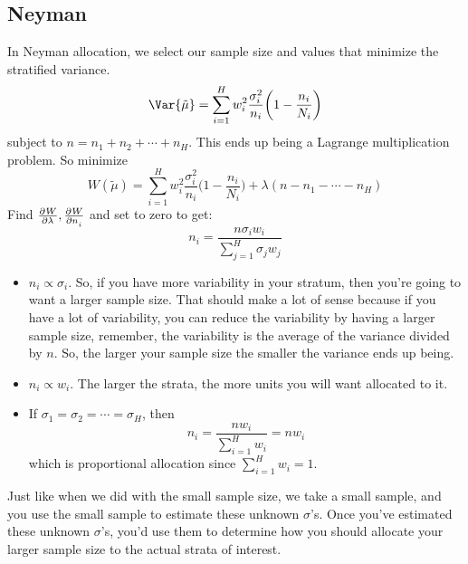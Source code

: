 \subsection*{Neyman}
In Neyman allocation, we select our sample size and values that minimize the stratified variance.
\[ \Var{\tilde{\mu}}=\sum_{i=1}^{H} w_i^2 \frac{\sigma_i^2}{n_i} \biggl(1-\frac{n_i}{N_i} \biggr) \]
subject to $ n=n_1+n_2+\cdots+n_H $. This ends up being a Lagrange multiplication problem.
So minimize
\[ W(\tilde{\mu})=\sum_{i=1}^{H} w_i^2 \frac{\sigma_i^2}{n_i} \biggl(1-\frac{n_i}{N_i} \biggr)+
    \lambda(n-n_1-\cdots-n_H) \]
Find $ \pd{W}{\lambda},\pd{W}{n_i} $ and set to zero to get:
\[ n_i=\frac{n\sigma_i w_i}{\sum_{j=1}^{H} \sigma_j w_j}  \]
\begin{Remark}{}{}
    \begin{itemize}
        \item $ n_i \propto \sigma_i $. So, if you have more variability in your stratum,
              then you're going to want a larger sample size. That should make a lot of
              sense because if you have a lot of variability, you can reduce the variability
              by having a larger sample size, remember, the variability
              is the average of the variance divided by $ n $.
              So, the larger your sample size the smaller the variance ends up being.
        \item $ n_i\propto w_i $. The larger the strata, the more
              units you will want allocated to it.
        \item If $ \sigma_1=\sigma_2=\cdots=\sigma_H $, then
              \[ n_i=\frac{n w_i}{\sum_{i=1}^{H} w_i}=n w_i  \]
              which is proportional allocation since $ \sum_{i=1}^{H} w_i=1 $.
    \end{itemize}
\end{Remark}
Just like when we did with the small sample size, we take a small sample, and you use the small sample
to estimate these unknown $ \sigma $'s. Once you've estimated these unknown $ \sigma $'s,
you'd use them to determine how you should allocate your larger sample size to the actual strata of interest.
